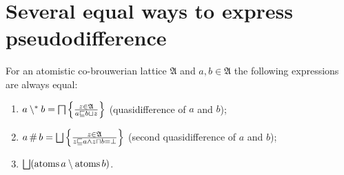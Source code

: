 \section{Several equal ways to express pseudodifference}
\begin{thm}
\label{pdiff-eq1}For an atomistic co-brouwerian lattice $\mathfrak{A}$
and $a,b\in\mathfrak{A}$ the following expressions are always equal:
\begin{enumerate}
\item \label{pdiff-pdiff}$a\setminus^{\ast} b=\bigsqcap\left\{ \frac{z\in\mathfrak{A}}{a\sqsubseteq b\sqcup z}\right\}$
(quasidifference of $a$ and $b$);
\item \label{pdiff-sec}$a\mathop\#b=\bigsqcup\setcond{z\in\mathfrak{A}}{z\sqsubseteq a\land z\sqcap b=\bot}$
(second quasidifference of $a$ and $b$);
\item \label{pdiff-atm}$\bigsqcup(\atoms a\setminus\atoms b)$.
\end{enumerate}
\end{thm}
